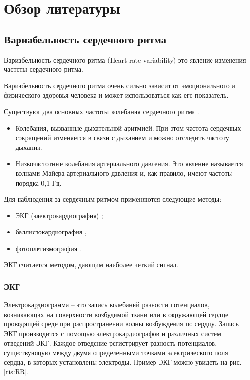 \chapter{Обзор литературы}

\section{Вариабельность сердечного ритма }

Вариабельность сердечного ритма (Heart rate variability) это явление изменения частоты сердечного ритма.

Вариабельность сердечного ритма очень сильно зависит от эмоционального \cite{hrv_and_sensitivity, hrv_and_respiratory} и физического \cite{hrv_and_phisical_health} здоровья человека и может использоваться как его показатель.

Существуют два основных частоты колебания сердечного ритма \cite{two_rates_hrv}.

\begin{itemize}
	\item Колебания, вызванные дыхательной аритмией. При этом частота сердечных сокращений изменяется в связи с дыханием и можно отследить частоту дыхания.
	\item Низкочастотные колебания артериального давления. Это явление называется волнами Майера \cite{mayer_wave} артериального давления и, как правило, имеют частоты порядка 0,1 Гц.
\end{itemize}

Для наблюдения за сердечным ритмом применяются следующие методы:

\begin{itemize}
	\item ЭКГ (электрокардиография) \cite{EKG};
	\item баллистокардиография  \cite{Ballistocardiograms};
	\item фотоплетизмография \cite{Photoplethysmography}.
\end{itemize}

ЭКГ считается методом, дающим наиболее четкий сигнал.

\subsection{ЭКГ}

Электрокардиограмма – это запись колебаний разности потенциалов, возникающих на поверхности возбудимой ткани или в окружающей сердце проводящей среде при распространении волны возбуждения по сердцу.\cite{ekg1} Запись ЭКГ производится с помощью электрокардиографов и различных систем отведений ЭКГ. Каждое отведение регистрирует разность потенциалов, существующую между двумя определенными точками электрического поля сердца, в которых установлены электроды. Пример ЭКГ можно увидеть на рис. \ref{ris:RR}.

